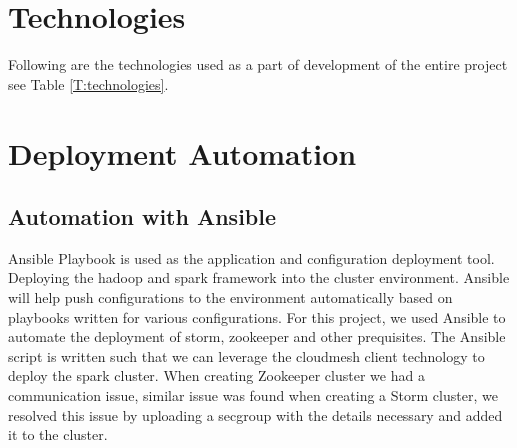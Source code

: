 \documentclass[9pt,twocolumn,twoside]{../../styles/osajnl}
\begin{document}
\section{Technologies}
Following are the technologies used as a part of development of the entire project see Table \ref{T:technologies}.
\begin{table}[htb]
\caption{Technologies} 
\label{T:technologies}
\centering
{}
\end{table}








  
\section{Deployment Automation}
\subsection{Automation with Ansible}
Ansible Playbook is used as the application and configuration
deployment tool. Deploying the hadoop and spark framework into the
cluster environment. Ansible will help push configurations to the
environment automatically based on playbooks written for various
configurations. For this project, we used Ansible to automate the
deployment of storm, zookeeper and other prequisites. The Ansible
script is written such that we can leverage the cloudmesh client
technology to deploy the spark cluster. When creating Zookeeper
cluster we had a communication issue, similar issue was found when
creating a Storm cluster, we resolved this issue by uploading a
secgroup with the details necessary and added it to the cluster.
\end{document}
